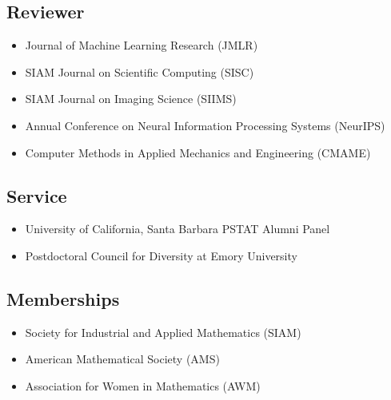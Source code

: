 \documentclass[11pt,a4paper,roman]{moderncv}
\begin{document}
\subsection{Reviewer}
\begin{itemize}
\item Journal of Machine Learning Research (JMLR)
\item SIAM Journal on Scientific Computing (SISC)
\item SIAM Journal on Imaging Science (SIIMS)
\item Annual Conference on Neural Information Processing Systems (NeurIPS)
\item Computer Methods in Applied Mechanics and Engineering (CMAME)
\end{itemize}
\subsection{Service}
\begin{itemize}
\item University of California, Santa Barbara PSTAT Alumni Panel
    \item Postdoctoral Council for Diversity at Emory University
\end{itemize}
\subsection{Memberships}
\begin{itemize}
\item Society for Industrial and Applied Mathematics (SIAM) 
\item American Mathematical Society (AMS)
\item Association for Women in Mathematics (AWM)
\end{itemize}

\end{document}
